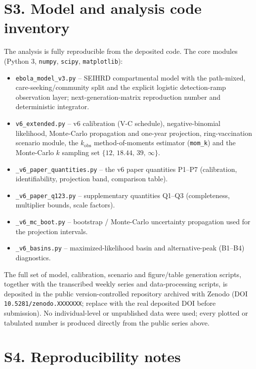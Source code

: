 \documentclass[11pt]{article}
\begin{document}
\section*{S3. Model and analysis code inventory}
\label{sec:si_code}

The analysis is fully reproducible from the deposited code. The core
modules (Python 3, \texttt{numpy}, \texttt{scipy}, \texttt{matplotlib}):

\begin{itemize}
  \item \texttt{ebola\_model\_v3.py} -- SEIHRD compartmental model with the path-mixed, care-seeking/community split and the explicit logistic detection-ramp observation layer; next-generation-matrix reproduction number and deterministic integrator.
  \item \texttt{v6\_extended.py} -- v6 calibration (V-C schedule), negative-binomial likelihood, Monte-Carlo propagation and one-year projection, ring-vaccination scenario module, the $k_{\mathrm{obs}}$ method-of-moments estimator (\texttt{mom\_k}) and the Monte-Carlo $k$ sampling set $\{12,\,18.44,\,39,\,\infty\}$.
  \item \texttt{\_v6\_paper\_quantities.py} -- the v6 paper quantities P1--P7 (calibration, identifiability, projection band, comparison table).
  \item \texttt{\_v6\_paper\_q123.py} -- supplementary quantities Q1--Q3 (completeness, multiplier bounds, scale factors).
  \item \texttt{\_v6\_mc\_boot.py} -- bootstrap / Monte-Carlo uncertainty propagation used for the projection intervals.
  \item \texttt{\_v6\_basins.py} -- maximized-likelihood basin and alternative-peak (B1--B4) diagnostics.
\end{itemize}

The full set of model, calibration, scenario and figure/table generation
scripts, together with the transcribed weekly series and data-processing
scripts, is deposited in the public version-controlled repository
archived with Zenodo (DOI \texttt{10.5281/zenodo.XXXXXXX}; replace with the
real deposited DOI before submission). No individual-level or unpublished
data were used; every plotted or tabulated number is produced directly
from the public series above.

\section*{S4. Reproducibility notes}
\label{sec:si_repro}
\end{document}
